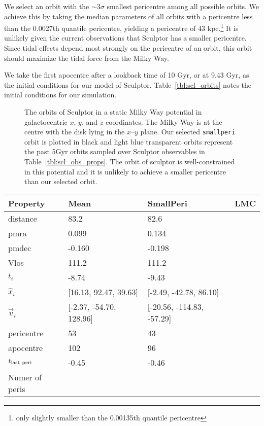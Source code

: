 We select an orbit with the \(\sim 3\sigma\) smallest pericentre among
all possible orbits. We achieve this by taking the median parameters of
all orbits with a pericentre less than the 0.0027th quantile pericentre,
yielding a pericentre of 43 kpc.\footnote{only slightly smaller than the
  0.00135th quantile pericentre} It is unlikely given the current
observations that Sculptor has a smaller pericentre. Since tidal effects
depend most strongly on the pericentre of an orbit, this orbit should
maximize the tidal force from the Milky Way.

We take the first apocentre after a lookback time of 10 Gyr, or at 9.43
Gyr, as the initial conditions for our model of Sculptor.
Table~\ref{tbl:scl_orbits} notes the initial conditions for our
simulation.

\begin{figure}
\centering
{}
\caption[Sculptor Orbits]{The orbits of Sculptor in a static Milky Way
potential in galactocentric \(x\), \(y\), and \(z\) coordinates. The
Milky Way is at the centre with the disk lying in the \(x\)--\(y\)
plane. Our selected \texttt{smallperi} orbit is plotted in black and
light blue transparent orbits represent the past 5Gyr orbits sampled
over Sculptor observables in Table~\ref{tbl:scl_obs_props}. The orbit of
sculptor is well-constrained in this potential and it is unlikely to
achieve a smaller pericentre than our selected
orbit.}\label{fig:scl_orbits}
\end{figure}

\begin{table*}[t]
\centering
\caption[Sculptor Selected Orbits]{Properties of selected orbits for Sculptor. The mean orbit represents the observational mean from Table \ref{tbl:scl_obs_props}. The Smallperi represents instead the $3\sigma$ smallest pericentre, which we use to provide an upper limit on tidal effects. }
\label{tbl:scl_orbits}
\begin{tabular}{llll}
\toprule
Property & Mean & SmallPeri & LMC\\
\midrule
distance & 83.2 & 82.6 & \\
pmra & 0.099 & 0.134 & \\
pmdec & -0.160 & -0.198 & \\
Vlos & 111.2 & 111.2 & \\
$t_i$ & -8.74 & -9.43 & \\
$\hat{x}_{i}$ & [16.13, 92.47, 39.63] & [-2.49, -42.78, 86.10] & \\
$\vec{v}_i$ & [-2.37, -54.70, 128.96] & [-20.56, -114.83, -57.29] & \\
pericentre & 53 & 43 & \\
apocentre & 102 & 96 & \\
$t_{\rm last\ peri}$ & -0.45 & -0.46 & \\
Numer of peris &  &  & \\
\bottomrule
\end{tabular}
\end{table*}


